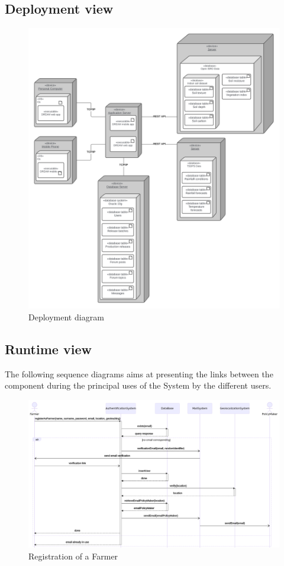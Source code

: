 \subsection{Deployment view}
\begin{figure} [H]
	\centering
	\includegraphics[width=\textwidth]{Images/deployment-view.png}
	\caption{\label{fig:component_diag} Deployment diagram}
\end{figure}

\subsection{Runtime view}
The following sequence diagrams aims at presenting the links between the component during the principal uses of the System by the different users.

\begin{figure} [H]
	\centering
	\includegraphics[width=\textwidth]{Images/seq_registration.png}
	\caption{\label{fig:seq_registration} Registration of a Farmer}
\end{figure}


